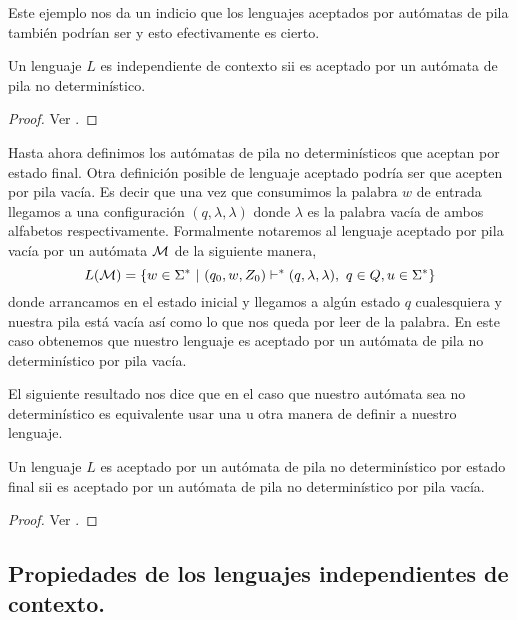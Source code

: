 \documentclass[tesis.tex]{subfiles}
\begin{document}
Este ejemplo nos da un indicio que los lenguajes aceptados por autómatas de pila también podrían ser \ic y esto efectivamente es cierto.

\medskip

\begin{teo}\label{teo_ic_apnd}
Un lenguaje $L$ es independiente de contexto sii es aceptado por un autómata de pila no determinístico.
\end{teo}

\begin{proof}
	Ver \cite{hopcraft-ullman}.
\end{proof}
 


Hasta ahora definimos los autómatas de pila no determinísticos que aceptan por estado final. Otra definición posible de lenguaje aceptado podría ser que acepten por pila vacía. 
Es decir que una vez que consumimos la palabra $w$ de entrada llegamos a una configuración $(q, \lambda, \lambda)$ donde $\lambda$ es la palabra vacía de ambos alfabetos respectivamente. Formalmente notaremos al lenguaje aceptado por pila vacía por un autómata $\cal M$
de la siguiente manera,
\begin{equation*}
	L({\cal M}) = \{ w \in \Sigma^* \ | \ (q_0,w,Z_0) \vdash^* (q, \lambda, \lambda), \ q \in Q, u \in \Sigma^*    \}
\end{equation*}
donde arrancamos en el estado inicial y llegamos a algún estado $q$ cualesquiera y nuestra pila está vacía así como lo que nos queda por leer de la palabra. 
En este caso obtenemos que nuestro lenguaje es aceptado por un autómata de pila no determinístico por pila vacía.


El siguiente resultado nos dice que en el caso que nuestro autómata sea no determinístico es equivalente usar una u otra manera de definir a nuestro lenguaje.

\medskip
\begin{teo}
Un lenguaje $L$ es aceptado por un autómata de pila no determinístico por estado final sii es aceptado por un autómata de pila no determinístico por pila vacía.
\end{teo}

\begin{proof}
	Ver \cite{hopcraft-ullman}.
\end{proof}


\subsection{Propiedades de los lenguajes independientes de contexto.}
\end{document}
